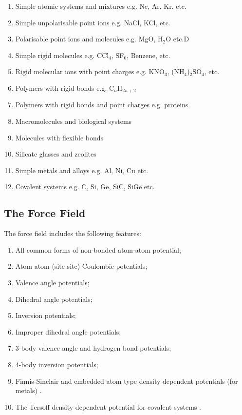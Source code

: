 \begin{enumerate}
\item Simple atomic systems and mixtures e.g. Ne, Ar, Kr, etc.
\item Simple unpolarisable point ions e.g. NaCl, KCl, etc.
\item Polarisable point ions and molecules e.g. MgO, H$_{2}$O etc.D
\item Simple rigid molecules e.g. CCl$_{4}$, SF$_{6}$, Benzene, etc.
\item Rigid molecular ions with point charges e.g. KNO$_{3}$,
(NH$_{4}$)$_{2}$SO$_{4}$, etc.
\item Polymers with rigid bonds e.g. C$_{n}$H$_{2n+2}$
\item Polymers with rigid bonds and point charges e.g. proteins
\item Macromolecules and biological systems
\item Molecules with flexible bonds
\item Silicate glasses and zeolites
\item Simple metals and alloys e.g. Al, Ni, Cu etc.
\item Covalent systems e.g. C, Si, Ge, SiC, SiGe etc.
\end{enumerate}

\subsection{The \D{} Force Field}

The \D{} force field includes the following features:

\begin{enumerate}
\item All common forms of non-bonded atom-atom potential;
\item Atom-atom (site-site) Coulombic potentials;
\item Valence angle potentials;
\item Dihedral angle potentials;
\item Inversion potentials;
\item Improper dihedral angle potentials;
\item 3-body valence angle and hydrogen bond potentials;
\item 4-body inversion potentials;
\item Finnis-Sinclair and embedded atom type density dependent potentials (for metals) \cite{finnis-84a,johnson-89a}.
\item The Tersoff density dependent potential for covalent systems \cite{tersoff-89a}.
\end{enumerate}


